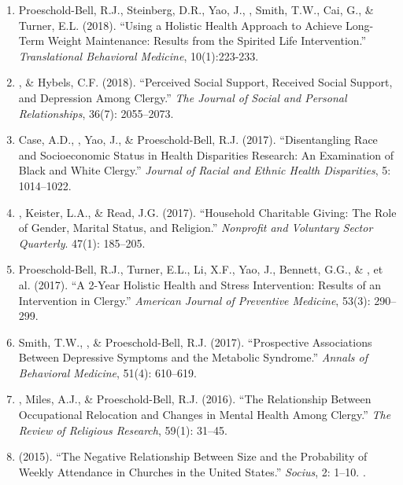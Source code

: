 \begin{enumerate}
\item Proeschold-Bell, R.J., Steinberg, D.R., Yao, J., \Eagle, Smith, T.W., Cai, G., \& Turner, E.L. (2018). ``Using a Holistic Health Approach to Achieve Long-Term Weight Maintenance: Results from the Spirited Life Intervention.'' \emph{Translational Behavioral Medicine}, 10(1):223-233. 

\item \Eagle, \& Hybels, C.F. (2018). ``Perceived Social Support, Received Social Support, and Depression Among Clergy.'' \emph{The Journal of Social and Personal Relationships}, 36(7): 2055--2073. 

\item Case, A.D., \Eagle, Yao, J., \& Proeschold-Bell, R.J. (2017). ``Disentangling Race and Socioeconomic Status in Health Disparities Research: An Examination of Black and White Clergy.'' \emph{Journal of Racial and Ethnic Health Disparities}, 5: 1014--1022. 

\item \Eagle, Keister, L.A., \& Read, J.G. (2017). ``Household Charitable Giving: The Role of Gender, Marital Status, and Religion.'' \emph{Nonprofit and Voluntary Sector Quarterly}. 47(1): 185--205. 

\item Proeschold-Bell, R.J., Turner, E.L., Li, X.F., Yao, J., Bennett, G.G., \& \Eagle, et al. (2017). ``A 2-Year Holistic Health and Stress Intervention: Results of an Intervention in Clergy.'' \emph{American Journal of Preventive Medicine}, 53(3): 290--299. 

\item Smith, T.W., \Eagle\CF, \& Proeschold-Bell, R.J. (2017). ``Prospective Associations Between Depressive Symptoms and the Metabolic Syndrome.'' \emph{Annals of Behavioral Medicine}, 51(4): 610--619. 

\item \Eagle, Miles, A.J., \& Proeschold-Bell, R.J. (2016). ``The Relationship Between Occupational Relocation and Changes in Mental Health Among Clergy.'' \emph{The Review of Religious Research}, 59(1): 31--45. 

\item \Eagle \hspace{.01em} (2015). ``The Negative Relationship Between Size and the Probability of Weekly Attendance in Churches in the United States.'' \emph{Socius}, 2: 1--10. .


\end{enumerate}
